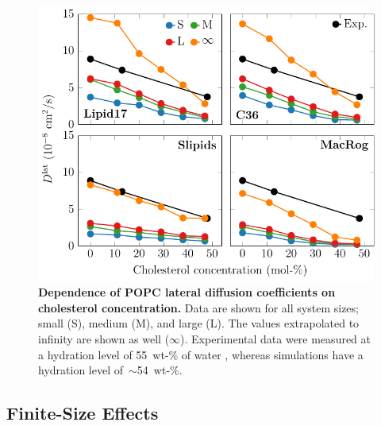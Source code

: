 \documentclass[journal=jpcbfk,manuscript=suppinfo]{achemso}
\begin{document}
\begin{figure}[htb!]
    \centering
    \includegraphics[width=0.9\linewidth]{../FIGS/d_vs_chol.pdf}
    \caption{\label{SIfig:dvschol}%
     \textbf{Dependence of POPC lateral diffusion coefficients on cholesterol concentration.} Data are shown for all system sizes; small (S), medium (M), and large (L). The values extrapolated to infinity are shown as well ($\infty$). Experimental data were measured at a hydration level of 55~wt-\% of water \cite{filippov2003effect,filippov2003influence}, whereas simulations have a hydration level of~$\sim$54~wt-\%.
    }
\end{figure}

\clearpage
\subsection{Finite-Size Effects}
\end{document}
